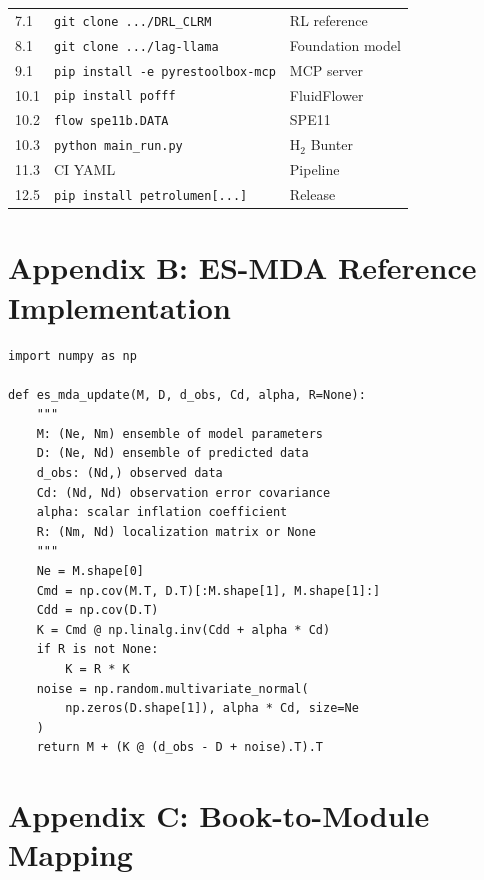 \documentclass[10pt,a4paper]{article}
\newcommand{\cmd}[1]{\texttt{#1}}
\begin{document}
\begin{longtable}{@{}p{2.4cm}p{4.2cm}p{6cm}@{}}
7.1 & \cmd{git clone .../DRL_CLRM} & RL reference\\
8.1 & \cmd{git clone .../lag-llama} & Foundation model\\
9.1 & \cmd{pip install -e pyrestoolbox-mcp} & MCP server\\
10.1 & \cmd{pip install pofff} & FluidFlower\\
10.2 & \cmd{flow spe11b.DATA} & SPE11\\
10.3 & \cmd{python main_run.py} & H$_2$ Bunter\\
11.3 & CI YAML & Pipeline\\
12.5 & \cmd{pip install petrolumen[...]} & Release\\
\bottomrule
\end{longtable}

\section{Appendix B: ES-MDA Reference Implementation}

\begin{lstlisting}[caption={ES-MDA update (NumPy).}]
import numpy as np

def es_mda_update(M, D, d_obs, Cd, alpha, R=None):
    """
    M: (Ne, Nm) ensemble of model parameters
    D: (Ne, Nd) ensemble of predicted data
    d_obs: (Nd,) observed data
    Cd: (Nd, Nd) observation error covariance
    alpha: scalar inflation coefficient
    R: (Nm, Nd) localization matrix or None
    """
    Ne = M.shape[0]
    Cmd = np.cov(M.T, D.T)[:M.shape[1], M.shape[1]:]
    Cdd = np.cov(D.T)
    K = Cmd @ np.linalg.inv(Cdd + alpha * Cd)
    if R is not None:
        K = R * K
    noise = np.random.multivariate_normal(
        np.zeros(D.shape[1]), alpha * Cd, size=Ne
    )
    return M + (K @ (d_obs - D + noise).T).T
\end{lstlisting}

\section{Appendix C: Book-to-Module Mapping}
\end{document}

